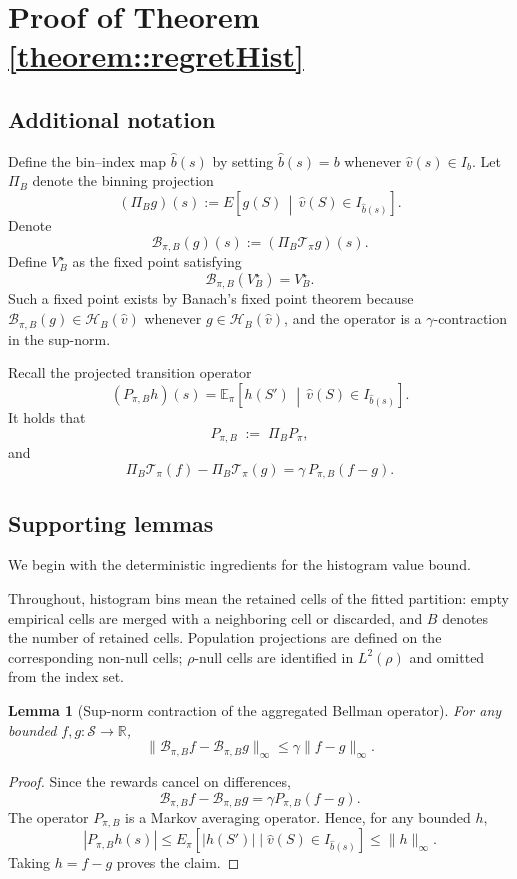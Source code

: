 \documentclass{article}
\theoremstyle{plain}
\newtheorem{lemma}{Lemma}
\theoremstyle{definition}
\theoremstyle{remark}
\begin{document}
\section{Proof of Theorem \ref{theorem::regretHist}}

\subsection{Additional notation}
Define the bin–index map $\hat{b}(s)$ by setting $\hat{b}(s) = b$ whenever
$\hat{v}(s) \in I_b$.  Let
$\Pi_B$ denote the binning projection
\[
(\Pi_B g)(s)
:= E\!\left[g(S)\,\middle|\,\hat v(S)\in I_{\hat b(s)}\right].
\] Denote 
\[
\mathcal B_{\pi,B}(g)(s)
:= (\Pi_B \mathcal{T}_{\pi}g)(s).
\]
Define $V_B^\star$ as the fixed point satisfying
\[
\mathcal B_{\pi,B}(V_B^\star) = V_B^\star.
\]
Such a fixed point exists by Banach's fixed point theorem because 
$\mathcal B_{\pi,B}(g) \in \mathcal H_B(\hat v)$ whenever 
$g \in \mathcal H_B(\hat v)$, and the operator is a $\gamma$-contraction in the
sup-norm. 


Recall the projected
transition operator 
\[
(P_{\pi,B} h)(s)
=
\mathbb{E}_{\pi}\left[h(S') \,\middle|\, \hat{v}(S) \in I_{\hat{b}(s)} \right].
\]
It holds that
\[
P_{\pi,B}
\;:=\;
\Pi_B P_\pi,
\]
and
\[
\Pi_B\mathcal{T}_\pi(f)
-
\Pi_B\mathcal{T}_\pi(g)
=
\gamma\, P_{\pi,B}(f-g).
\]

\subsection{Supporting lemmas}
We begin with the deterministic ingredients for the histogram value bound.

Throughout, histogram bins mean the retained cells of the fitted partition:
empty empirical cells are merged with a neighboring cell or discarded, and
\(B\) denotes the number of retained cells. Population projections are defined
on the corresponding non-null cells; \(\rho\)-null cells are identified in
\(L^2(\rho)\) and omitted from the index set.




\begin{lemma}[Sup-norm contraction of the aggregated Bellman operator]
\label{lemma::agg-sup-contraction}
For any bounded \(f,g:\mathcal S\to\mathbb R\),
\[
\|\mathcal B_{\pi,B}f-\mathcal B_{\pi,B}g\|_\infty
\le
\gamma\|f-g\|_\infty .
\]
\end{lemma}

\begin{proof}
Since the rewards cancel on differences,
\[
\mathcal B_{\pi,B}f-\mathcal B_{\pi,B}g
=
\gamma P_{\pi,B}(f-g).
\]
The operator \(P_{\pi,B}\) is a Markov averaging
operator. Hence, for any bounded \(h\),
\[
|P_{\pi,B}h(s)|
\le
E_\pi[|h(S')|\mid \hat v(S)\in I_{\hat b(s)}]
\le
\|h\|_\infty .
\]
Taking \(h=f-g\) proves the claim.
\end{proof}
\end{document}
